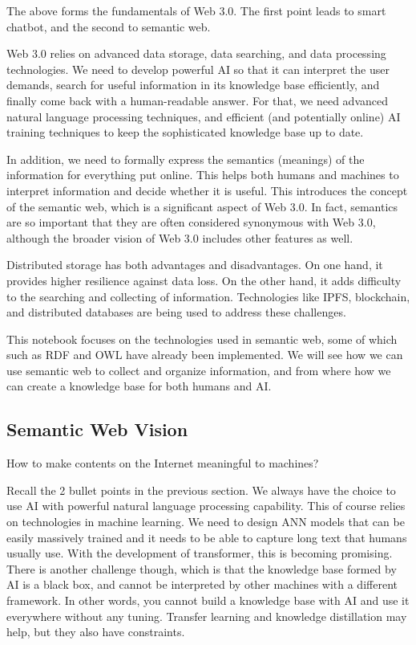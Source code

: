The above forms the fundamentals of Web 3.0. The first point leads to smart chatbot, and the second to semantic web.

Web 3.0 relies on advanced data storage, data searching, and data processing technologies. We need to develop powerful AI so that it can interpret the user demands, search for useful information in its knowledge base efficiently, and finally come back with a human-readable answer. For that, we need advanced natural language processing techniques, and efficient (and potentially online) AI training techniques to keep the sophisticated knowledge base up to date.

In addition, we need to formally express the semantics (meanings) of the information for everything put online. This helps both humans and machines to interpret information and decide whether it is useful. This introduces the concept of the semantic web, which is a significant aspect of Web 3.0. In fact, semantics are so important that they are often considered synonymous with Web 3.0, although the broader vision of Web 3.0 includes other features as well.

Distributed storage has both advantages and disadvantages. On one hand, it provides higher resilience against data loss. On the other hand, it adds difficulty to the searching and collecting of information. Technologies like IPFS, blockchain, and distributed databases are being used to address these challenges.

This notebook focuses on the technologies used in semantic web, some of which such as RDF and OWL have already been implemented. We will see how we can use semantic web to collect and organize information, and from where how we can create a knowledge base for both humans and AI.

\subsection{Semantic Web Vision}

How to make contents on the Internet meaningful to machines? 

Recall the 2 bullet points in the previous section. We always have the choice to use AI with powerful natural language processing capability. This of course relies on technologies in machine learning. We need to design ANN models that can be easily massively trained and it needs to be able to capture long text that humans usually use. With the development of transformer, this is becoming promising. There is another challenge though, which is that the knowledge base formed by AI is a black box, and cannot be interpreted by other machines with a different framework. In other words, you cannot build a knowledge base with AI and use it everywhere without any tuning. Transfer learning and knowledge distillation may help, but they also have constraints.

